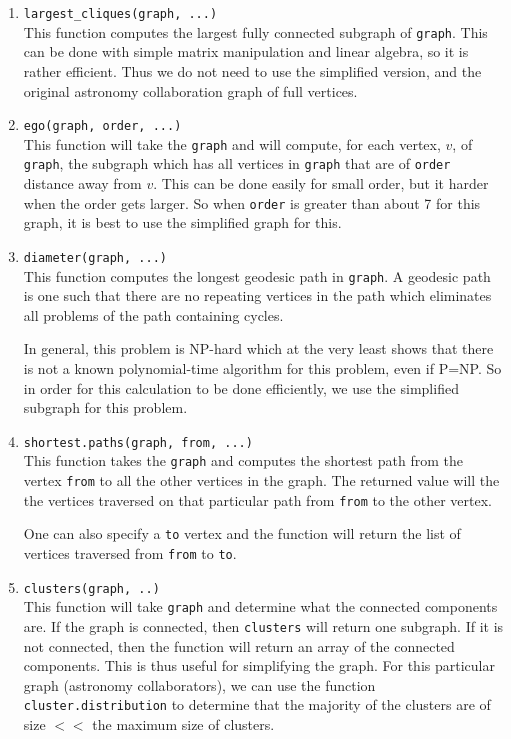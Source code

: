 \documentclass{article}
\begin{document}
\begin{enumerate}
	
	\item \texttt{largest\_cliques(graph, ...)}\\
	This function computes the largest fully connected subgraph of \texttt{graph}. This can be done with simple matrix manipulation and linear algebra, so it is rather efficient. Thus we do not need to use the simplified version, and the original astronomy collaboration graph of full vertices. 
		
	\item \texttt{ego(graph, order, ...)}\\
	This function will take the \texttt{graph} and will compute, for each vertex, $v$, of \texttt{graph}, the subgraph which has all vertices in \texttt{graph} that are of \texttt{order} distance away from $v$. This can be done easily for small order, but it harder when the order gets larger. So when \texttt{order} is greater than about 7 for this graph, it is best to use the simplified graph for this. 
	
	\item \texttt{diameter(graph, ...)}\\
	This function computes the longest geodesic path in \texttt{graph}. A geodesic path is one such that there are no repeating vertices in the path which eliminates all problems of the path containing cycles. 
	
	In general, this problem is NP-hard which at the very least shows that there is not a known polynomial-time algorithm for this problem, even if P=NP. So in order for this calculation to be done efficiently, we use the simplified subgraph for this problem.
	
	\item \texttt{shortest.paths(graph, from, ...)}\\
	This function takes the \texttt{graph} and computes the shortest path from the vertex \texttt{from} to all the other vertices in the graph. The returned value will the the vertices traversed on that particular path from \texttt{from} to the other vertex. 
	
	One can also specify a \texttt{to} vertex and the function will return the list of vertices traversed from \texttt{from} to \texttt{to}.
	
	\item \texttt{clusters(graph, ..)}\\
	This function will take \texttt{graph} and determine what the connected components are. If the graph is connected, then \texttt{clusters} will return one subgraph. If it is not connected, then the function will return an array of the connected components. This is thus useful for simplifying the graph. For this particular graph (astronomy collaborators), we can use the function \texttt{cluster.distribution} to determine that the majority of the clusters are of size $<<$ the maximum size of clusters.
	
\end{enumerate}
\end{document}
